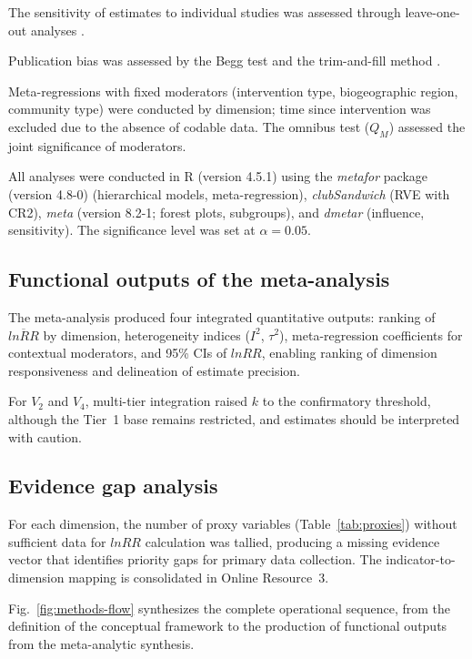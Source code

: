 \documentclass[12pt,a4paper]{article}
\begin{document}
The sensitivity of estimates to individual studies was assessed through leave-one-out analyses \citep{Viechtbauer2010}.

Publication bias was assessed by the Begg test \citep{Begg1994} and the trim-and-fill method \citep{Duval2000}.

Meta-regressions with fixed moderators (intervention type, biogeographic region, community type) were conducted by dimension; time since intervention was excluded due to the absence of codable data. The omnibus test ($Q_M$) assessed the joint significance of moderators.

All analyses were conducted in R (version 4.5.1) using the \textit{metafor} package (version 4.8-0) \citep{Viechtbauer2010} (hierarchical models, meta-regression), \textit{clubSandwich} \citep{Pustejovsky2022} (RVE with CR2), \textit{meta} (version 8.2-1; forest plots, subgroups), and \textit{dmetar} (influence, sensitivity). The significance level was set at $\alpha = 0.05$.

\subsection{Functional outputs of the meta-analysis}
\label{sec:outputs}

The meta-analysis produced four integrated quantitative outputs: ranking of $\overline{lnRR}$ by dimension, heterogeneity indices ($I^2$, $\tau^2$), meta-regression coefficients for contextual moderators, and 95\% CIs of $lnRR$, enabling ranking of dimension responsiveness and delineation of estimate precision.

For $V_2$ and $V_4$, multi-tier integration raised $k$ to the confirmatory threshold, although the Tier~1 base remains restricted, and estimates should be interpreted with caution.

\subsection{Evidence gap analysis}
\label{sec:gaps}

For each dimension, the number of proxy variables (Table~\ref{tab:proxies}) without sufficient data for $lnRR$ calculation was tallied, producing a missing evidence vector that identifies priority gaps for primary data collection. The indicator-to-dimension mapping is consolidated in Online Resource~3.

Fig.~\ref{fig:methods-flow} synthesizes the complete operational sequence, from the definition of the conceptual framework to the production of functional outputs from the meta-analytic synthesis.
\end{document}

